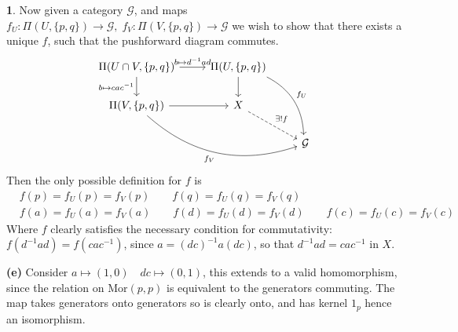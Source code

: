 \documentclass[10.5pt]{article}
\theoremstyle{definition}
\newtheorem{pb}{}
\newcommand{\set}[1]{\{#1\}}
\begin{document}
\begin{pb}
        Now given a category \(\mathcal{G}\), and maps 
        \(f_U: \Pi(U,\set{p,q}) \to \mathcal{G}, \; f_V: \Pi(V,\set{p,q}) \to \mathcal{G}\) we wish to show that there exists a unique \(f\), such that the pushforward diagram commutes.
        \begin{equation*}
            \begin{tikzcd}
                \Pi(U\cap V, \set{p,q}) \arrow[d,"b \mapsto cac^{-1}"'] \arrow[r,"b \mapsto d^{-1}ad"] &
                \Pi(U, \set{p,q}) \arrow[d,""'] \arrow[ddr,bend left,"f_U"] \\
                \Pi(V, \set{p,q}) \arrow[r,""] \arrow[drr,bend right,"f_V"'] &
                X \arrow[dr,dashed,"\exists ! f"] \\
                && \mathcal{G}
            \end{tikzcd}
        \end{equation*}
        Then the only possible definition for \(f\) is
        \begin{align*}
            &f(p) = f_U(p) = f_V(p) \quad \quad f(q) = f_U(q) = f_V(q) \\
            &f(a) = f_U(a) = f_V(a) \quad \quad f(d) = f_U(d) = f_V(d) \quad \quad f(c) = f_U(c) = f_V(c)
        \end{align*}
        Where \(f\) clearly satisfies the necessary condition for commutativity: \(f(d^{-1}ad) = f(cac^{-1})\), since \(a = (dc)^{-1}a(dc)\), so that
        \(d^{-1}ad = cac^{-1}\) in \(X\).

        \textbf{(e)} Consider \(a \mapsto (1,0) \quad dc \mapsto (0,1)\), this extends to a valid homomorphism, since the relation on \(\text{Mor}(p,p)\) is equivalent to the generators commuting.
        The map takes generators onto generators so is clearly onto, and has kernel \(1_p\) hence an isomorphism.
        
    \end{pb}
\end{document}
